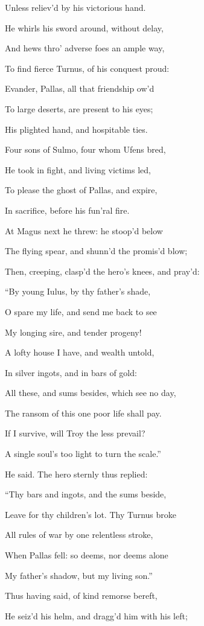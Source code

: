 Unless reliev’d by his victorious hand.

He whirls his sword around, without delay,

And hews thro’ adverse foes an ample way,

To find fierce Turnus, of his conquest proud:

Evander, Pallas, all that friendship ow’d

To large deserts, are present to his eyes;

His plighted hand, and hospitable ties.

Four sons of Sulmo, four whom Ufens bred,

He took in fight, and living victims led,

To please the ghost of Pallas, and expire,

In sacrifice, before his fun’ral fire.

At Magus next he threw: he stoop’d below

The flying spear, and shunn’d the promis’d blow;

Then, creeping, clasp’d the hero’s knees, and pray’d:

“By young Iulus, by thy father’s shade,

O spare my life, and send me back to see

My longing sire, and tender progeny!

A lofty house I have, and wealth untold,

In silver ingots, and in bars of gold:

All these, and sums besides, which see no day,

The ransom of this one poor life shall pay.

If I survive, will Troy the less prevail?

A single soul’s too light to turn the scale.”

He said. The hero sternly thus replied:

“Thy bars and ingots, and the sums beside,

Leave for thy children’s lot. Thy Turnus broke

All rules of war by one relentless stroke,

When Pallas fell: so deems, nor deems alone

My father’s shadow, but my living son.”

Thus having said, of kind remorse bereft,

He seiz’d his helm, and dragg’d him with his left;

